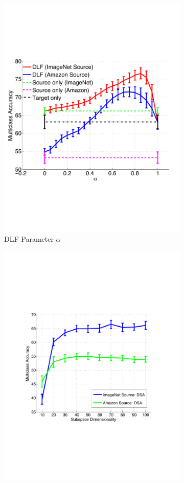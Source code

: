\begin{figure}
\centering
\begin{subfigure}[b]{0.26\textwidth}
\centering
\includegraphics[height=\textwidth]{figs/amazonAndImagenet-linint-vs-alpha_C1_fc8.pdf}
\caption{DLF Parameter $\alpha$}
\label{fig:linint-eval}
\end{subfigure}
%
\hfill
\begin{subfigure}[b]{0.27\textwidth}
\centering
\includegraphics[height=\linewidth]{figs/amazonAndImagenet-sa_dim_C1_fc7.pdf}

\end{subfigure}
\end{figure}
